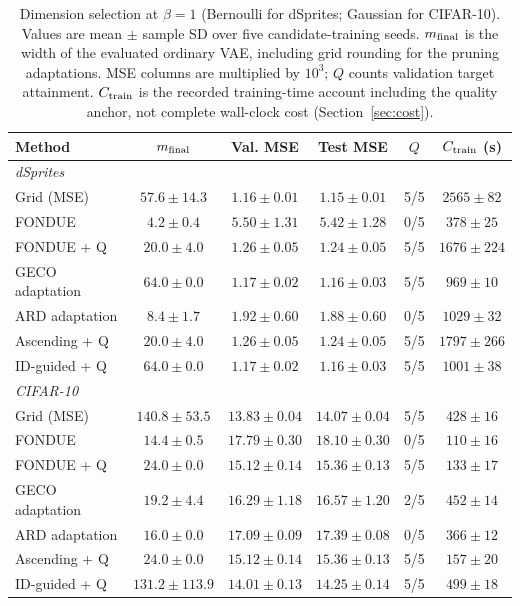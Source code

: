 \documentclass[make,article,submit,pdftex,moreauthors]{Definitions/mdpi}
\begin{document}
\begin{table}[H]
\caption{Dimension selection at $\beta=1$ (Bernoulli for dSprites; Gaussian for CIFAR-10). Values are mean $\pm$ sample SD over five candidate-training seeds. $m_{\rm final}$ is the width of the evaluated ordinary VAE, including grid rounding for the pruning adaptations. MSE columns are multiplied by $10^3$; $Q$ counts validation target attainment. $C_{\rm train}$ is the recorded training-time account including the quality anchor, not complete wall-clock cost (Section~\ref{sec:cost}).}\label{tab:main2}
\footnotesize
\setlength{\tabcolsep}{3.5pt}
\begin{tabular*}{\textwidth}{@{\extracolsep{\fill}}lccccc@{}}
\toprule
Method & $m_{\rm final}$ & Val. MSE & Test MSE & $Q$ & $C_{\rm train}$ (s) \\
\midrule
\multicolumn{6}{l}{\emph{dSprites}} \\
Grid (MSE) & $57.6 \pm 14.3$ & $1.16 \pm 0.01$ & $1.15 \pm 0.01$ & 5/5 & $2565 \pm 82$ \\
FONDUE & $4.2 \pm 0.4$ & $5.50 \pm 1.31$ & $5.42 \pm 1.28$ & 0/5 & $378 \pm 25$ \\
FONDUE + Q & $20.0 \pm 4.0$ & $1.26 \pm 0.05$ & $1.24 \pm 0.05$ & 5/5 & $1676 \pm 224$ \\
GECO adaptation & $64.0 \pm 0.0$ & $1.17 \pm 0.02$ & $1.16 \pm 0.03$ & 5/5 & $969 \pm 10$ \\
ARD adaptation & $8.4 \pm 1.7$ & $1.92 \pm 0.60$ & $1.88 \pm 0.60$ & 0/5 & $1029 \pm 32$ \\
Ascending + Q & $20.0 \pm 4.0$ & $1.26 \pm 0.05$ & $1.24 \pm 0.05$ & 5/5 & $1797 \pm 266$ \\
ID-guided + Q & $64.0 \pm 0.0$ & $1.17 \pm 0.02$ & $1.16 \pm 0.03$ & 5/5 & $1001 \pm 38$ \\
\midrule
\multicolumn{6}{l}{\emph{CIFAR-10}} \\
Grid (MSE) & $140.8 \pm 53.5$ & $13.83 \pm 0.04$ & $14.07 \pm 0.04$ & 5/5 & $428 \pm 16$ \\
FONDUE & $14.4 \pm 0.5$ & $17.79 \pm 0.30$ & $18.10 \pm 0.30$ & 0/5 & $110 \pm 16$ \\
FONDUE + Q & $24.0 \pm 0.0$ & $15.12 \pm 0.14$ & $15.36 \pm 0.13$ & 5/5 & $133 \pm 17$ \\
GECO adaptation & $19.2 \pm 4.4$ & $16.29 \pm 1.18$ & $16.57 \pm 1.20$ & 2/5 & $452 \pm 14$ \\
ARD adaptation & $16.0 \pm 0.0$ & $17.09 \pm 0.09$ & $17.39 \pm 0.08$ & 0/5 & $366 \pm 12$ \\
Ascending + Q & $24.0 \pm 0.0$ & $15.12 \pm 0.14$ & $15.36 \pm 0.13$ & 5/5 & $157 \pm 20$ \\
ID-guided + Q & $131.2 \pm 113.9$ & $14.01 \pm 0.13$ & $14.25 \pm 0.14$ & 5/5 & $499 \pm 18$ \\
\bottomrule
\end{tabular*}
\end{table}
\end{document}
